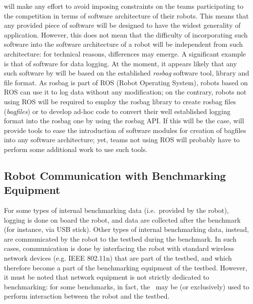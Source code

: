 \erlir will make any effort to avoid imposing constraints on the teams participating to the competition in terms of software architecture of their robots. This means that any provided piece of software will be designed to have the widest generality of application. However, this does not mean that the difficulty of incorporating such software into the software architecture of a robot will be independent from such architecture: for technical reasons, differences may emerge. A significant example is that of software for data logging. At the moment, it appears likely that any such software by \erlir will be based on the established \emph{rosbag} software tool, library and file format. As rosbag is part of ROS (Robot Operating System), robots based on ROS can use it to log data without any modification; on the contrary, robots not using ROS will be required to employ the rosbag library to create rosbag files (\emph{bagfiles}) or to develop ad-hoc code to convert their well established logging format into the rosbag one by using the rosbag API. If this will be the case, \erlir will provide tools to ease the introduction of software modules for creation of bagfiles into any software architecture; yet, teams not using ROS will probably have to perform some additional work to use such tools.

\subsection{Robot Communication with Benchmarking Equipment}
\label{ssec:BenchEquipRobotCommunication}
For some types of internal benchmarking data (i.e.~provided by the robot), logging is done on board the robot, and data are collected after the benchmark (for instance, via USB stick). Other types of internal benchmarking data, instead, are communicated by the robot to the testbed during the benchmark. In such cases, communication is done by interfacing the robot with standard wireless network devices (e.g. IEEE 802.11n) that are part of the testbed, and which therefore become a part of the benchmarking equipment of the testbed. However, it must be noted that network equipment is not strictly dedicated to benchmarking: for some benchmarks, in fact, the \wifi ~may be (or exclusively) used to perform interaction between the robot and the testbed.

